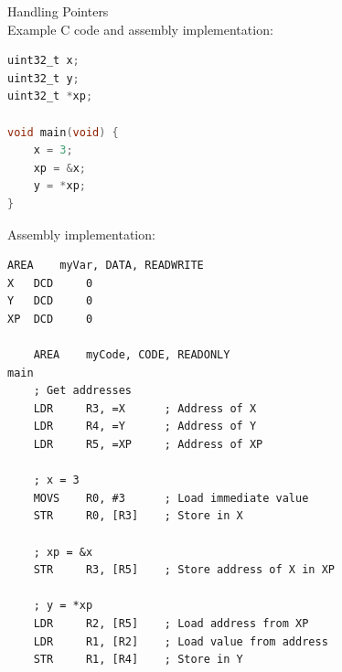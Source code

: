 \begin{example2}{Handling Pointers}\\
Example C code and assembly implementation:
\begin{lstlisting}[language=C, style=basesmol]
uint32_t x;
uint32_t y;
uint32_t *xp;

void main(void) {
    x = 3;
    xp = &x;
    y = *xp;
}
\end{lstlisting}

Assembly implementation:
\begin{lstlisting}[language=armasm, style=basesmol]
    AREA    myVar, DATA, READWRITE
X   DCD     0
Y   DCD     0
XP  DCD     0

    AREA    myCode, CODE, READONLY
main
    ; Get addresses
    LDR     R3, =X      ; Address of X
    LDR     R4, =Y      ; Address of Y
    LDR     R5, =XP     ; Address of XP
    
    ; x = 3
    MOVS    R0, #3      ; Load immediate value
    STR     R0, [R3]    ; Store in X
    
    ; xp = &x
    STR     R3, [R5]    ; Store address of X in XP
    
    ; y = *xp
    LDR     R2, [R5]    ; Load address from XP
    LDR     R1, [R2]    ; Load value from address
    STR     R1, [R4]    ; Store in Y
\end{lstlisting}
\end{example2}

